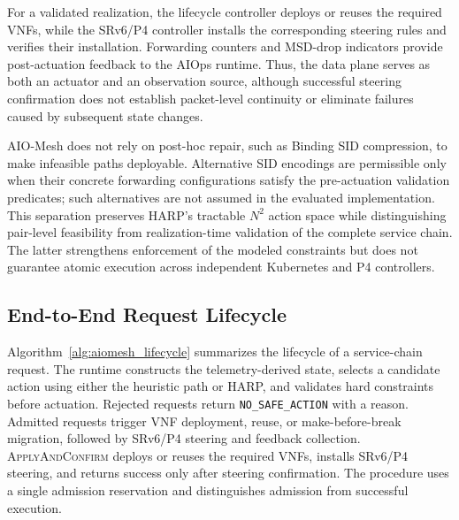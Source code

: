 \documentclass[final,5p]{elsarticle}
\newcommand{\rev}[1]{\textcolor{BrickRed}{#1}}
\begin{document}
For a validated realization, the lifecycle controller deploys or reuses the required VNFs, while the SRv6/P4 controller installs the corresponding steering rules and verifies their installation. Forwarding counters and MSD-drop indicators provide post-actuation feedback to the AIOps runtime. Thus, the data plane serves as both an actuator and an observation source, although successful steering confirmation does not establish packet-level continuity or eliminate failures caused by subsequent state changes.

AIO-Mesh does not rely on post-hoc repair, such as Binding SID compression, to make infeasible paths deployable. \rev{Alternative SID encodings are permissible only when their concrete forwarding configurations satisfy the pre-actuation validation predicates; such alternatives are not assumed in the evaluated implementation.} This separation preserves HARP's tractable \(N^2\) action space while \rev{distinguishing pair-level feasibility from realization-time validation of the complete service chain}. The latter strengthens enforcement of the modeled constraints but does not guarantee atomic execution across independent Kubernetes and P4 controllers.

\subsection{End-to-End Request Lifecycle}
\label{subsec:request_lifecycle}
Algorithm~\ref{alg:aiomesh_lifecycle} summarizes the lifecycle of a service-chain request. The runtime constructs the telemetry-derived state, selects a candidate action using either the heuristic path or HARP, and validates hard constraints before actuation. Rejected requests return \texttt{NO\_SAFE\_ACTION} with a reason. Admitted requests trigger VNF deployment, reuse, or make-before-break migration, followed by SRv6/P4 steering and feedback collection. \rev{\textsc{ApplyAndConfirm} deploys or reuses the required VNFs, installs SRv6/P4 steering, and returns success only after steering confirmation. The procedure uses a single admission reservation and distinguishes admission from successful execution.}

\sloppy
\end{document}
